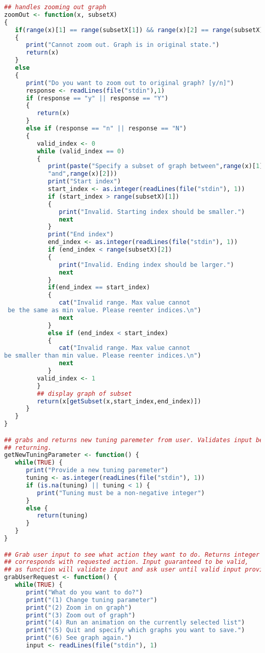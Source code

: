 \documentclass{article}
\begin{document}
\begin{lstlisting}[frame=single,language=R,showstringspaces=false]
## handles zooming out graph
zoomOut <- function(x, subsetX)
{
   if(range(x)[1] == range(subsetX[1]) && range(x)[2] == range(subsetX)[2])
   {
      print("Cannot zoom out. Graph is in original state.")
      return(x)
   }
   else
   {
      print("Do you want to zoom out to original graph? [y/n]")
      response <- readLines(file("stdin"),1)
      if (response == "y" || response == "Y")
      {
         return(x)
      }
      else if (response == "n" || response == "N")
      {
         valid_index <- 0
         while (valid_index == 0)
         {
            print(paste("Specify a subset of graph between",range(x)[1],
            "and",range(x)[2]))
            print("Start index")
            start_index <- as.integer(readLines(file("stdin"), 1))
            if (start_index > range(subsetX)[1])
            {
               print("Invalid. Starting index should be smaller.")
               next
            }
            print("End index")
            end_index <- as.integer(readLines(file("stdin"), 1))
            if (end_index < range(subsetX)[2])
            {
               print("Invalid. Ending index should be larger.")
               next
            }
            if(end_index == start_index)
            {
               cat("Invalid range. Max value cannot
 be the same as min value. Please reenter indices.\n")
               next
            }
            else if (end_index < start_index)
            {
               cat("Invalid range. Max value cannot 
be smaller than min value. Please reenter indices.\n")
               next
            }
         valid_index <- 1
         }
         ## display graph of subset
         return(x[getSubset(x,start_index,end_index)])
      }
   }
}

## grabs and returns new tuning paremeter from user. Validates input before
## returning.
getNewTuningParameter <- function() {
   while(TRUE) {
      print("Provide a new tuning paremeter")
      tuning <- as.integer(readLines(file("stdin"), 1))
      if (is.na(tuning) || tuning < 1) {
         print("Tuning must be a non-negative integer")
      }
      else {
         return(tuning)
      }
   }
}

## Grab user input to see what action they want to do. Returns integer that
## corresponds with requested action. Input guaranteed to be valid,
## as function will validate input and ask user until valid input provided.
grabUserRequest <- function() {
   while(TRUE) {
      print("What do you want to do?")
      print("(1) Change tuning parameter")
      print("(2) Zoom in on graph")
      print("(3) Zoom out of graph")
      print("(4) Run an animation on the currently selected list")
      print("(5) Quit and specify which graphs you want to save.")
      print("(6) See graph again.")
      input <- readLines(file("stdin"), 1)


\end{lstlisting}
\end{document}
